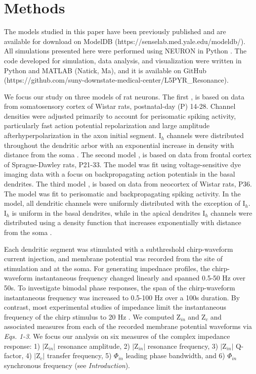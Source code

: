 \documentclass[utf8]{frontiersSCNS} %
\begin{document}
\section{Methods}
The models studied in this paper have been previously published and are available for download on ModelDB (https://senselab.med.yale.edu/modeldb/).
All simulations presented here were performed using NEURON in Python \citep{Hines2009-qx}.  The code 
developed for simulation, data analysis, and visualization were written in Python and MATLAB (Natick, Ma), and it
is available on GitHub (https://github.com/suny-downstate-medical-center/L5PYR\_Resonance).

We focus our study on three models of rat neurons.  The first \citep{Kole2008-aj}, is based on data from
somatosensory cortex of Wistar rats, postnatal-day (P) 14-28. Channel densities were adjusted primarily to 
account for perisomatic spiking activity, particularly fast action potential repolarization and large amplitude 
afterhyperpolarization in the axon initial segment.  I$_h$ channels were distributed throughout the dendritic
arbor with an exponential increase in density with distance from the soma \citep{Kole2006-bm}. The second model
\citep{Acker2009-yj}, is based on data from frontal cortex of Sprague-Dawley rats, P21-33.  The model was fit
using voltage-sensitive dye imaging data with a focus on backpropagating action potentials in the basal
dendrites.  The third model \citep{Hay2011-if}, is based on data from neocortex of Wistar rats, P36.  The model
was fit to perisomatic and backpropagating spiking activity.  In the model, all dendritic channels were 
uniformly distributed with the exception of I$_h$.  I$_h$ is uniform in the basal dendrites, while in the apical dendrites
I$_h$ channels were distributed using a density function that increases exponentially with distance from the soma 
\citep{Nevian2007-gw, Kole2006-bm}.

Each dendritic segment was stimulated with a subthreshold chirp-waveform current injection, and membrane potential
was recorded from the site of stimulation and at the soma. For generating impednace profiles, the chirp-waveform 
instantaneous frequency changed linearly and spanned 0.5-50 Hz over 50s. To investigate bimodal phase responses, the
span of the chirp-waveform instantaneous frequency was increased to 0.5-100 Hz over a 100s duration.  By contrast,
most experimental studies of impedance limit the instantaneous frequency of the chirp stimulus to 20 Hz 
\citep{Ulrich2002-dd, Dembrow2015-zb}.  We computed Z$_{in}$ and Z$_c$ and associated measures from each of the 
recorded membrane potential waveforms via \emph{Eqs. 1-3}.  We focus our analysis on six measures of the complex 
impedance response: 1) $|$Z$_{in}|$ resonance amplitude, 2) $|$Z$_{in}|$ resonance frequency,
3) $|$Z$_{in}|$ Q-factor, 4) $|$Z$_{c}|$ transfer frequency, 5) $\Phi_{in}$ leading phase bandwidth, 
and 6) $\Phi_{in}$ synchronous frequency (see \emph{Introduction}).
\end{document}
